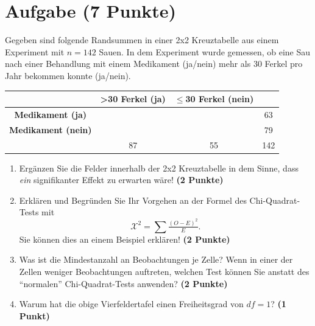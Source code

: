 \documentclass[a4paper, 10pt]{scrartcl}\usepackage[]{graphicx}\usepackage[]{color}
\begin{document}
\section{Aufgabe \hfill (7 Punkte)}



Gegeben sind folgende Randsummen in einer 2x2 Kreuztabelle aus einem
Experiment mit $n = 142$ Sauen. In dem Experiment wurde gemessen,
ob eine Sau nach einer Behandlung mit einem Medikament (ja/nein)
mehr als 30 Ferkel pro Jahr bekommen konnte (ja/nein).

\vspace{5Ex}

\begin{center}
  \Large
  \begin{tabular}{c|c|c|c}
     & \textbf{>30 Ferkel (ja)} & \textbf{$\leq$30 Ferkel (nein)} &  \strut\\
    \hline
    \textbf{Medikament (ja)} & \phantom{100}  & \phantom{100}  &   63  \strut\\
    \hline
    \textbf{Medikament (nein)} & \phantom{100}  & \phantom{100}  &   79   \strut\\
    \hline
     &  87 &  55 &  142  \strut\\
  \end{tabular}
\end{center}



\vspace{5Ex}

\begin{enumerate}
\item Erg{\"a}nzen Sie die Felder innerhalb der 2x2 Kreuztabelle in dem Sinne,
  dass \textit{ein} signifikanter Effekt zu erwarten w{\"a}re!
  \textbf{(2 Punkte)}
\item Erkl{\"a}ren und Begr{\"u}nden Sie Ihr Vorgehen an der Formel des
  Chi-Quadrat-Tests mit
  \begin{equation*}
  \mathcal{X}^2 = \sum\tfrac{(O - E)^2}{E}.  
  \end{equation*}
  Sie k{\"o}nnen dies an einem Beispiel erkl{\"a}ren! \textbf{(2 Punkte)}
\item Was ist die Mindestanzahl an Beobachtungen je Zelle? Wenn in einer
  der Zellen weniger Beobachtungen auftreten, welchen Test k{\"o}nnen Sie
  anstatt des "`normalen"' Chi-Quadrat-Tests anwenden? \textbf{(2 Punkte)}
\item Warum hat die obige Vierfeldertafel einen Freiheitsgrad von $df=1$?
  \textbf{(1 Punkt)}
\end{enumerate} 
\clearpage
\end{document}
